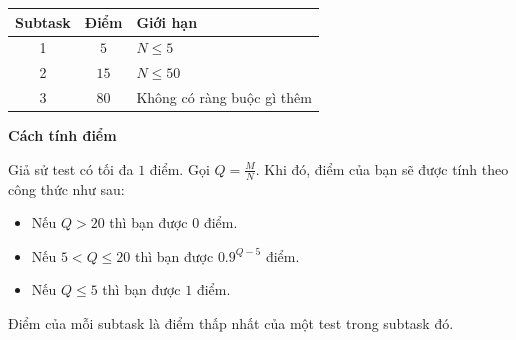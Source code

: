 \begin{center}
  \begin{tabular}{|c|c|l|} \hline
    \textbf{Subtask} & \textbf{Điểm} & \textbf{Giới hạn} \\ \hline
    1 & $5$ & $N\le 5$ \\ \hline
    2 & $15$ & $N\le 50$ \\ \hline
    3 & $80$ & Không có ràng buộc gì thêm \\ \hline
  \end{tabular}
\end{center}

\textbf{Cách tính điểm}

Giả sử test có tối đa $1$ điểm. Gọi $Q=\frac{M}N$. Khi đó, điểm của bạn sẽ được tính theo công thức như sau:
\begin{itemize}
   \item Nếu $Q>20$ thì bạn được $0$ điểm.
   \item Nếu $5<Q\le 20$ thì bạn được $0.9^{Q-5}$ điểm.
   \item Nếu $Q\le 5$ thì bạn được $1$ điểm.
\end{itemize}

Điểm của mỗi subtask là điểm thấp nhất của một test trong subtask đó.